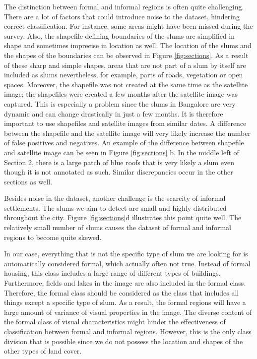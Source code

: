 The distinction between formal and informal regions is often quite challenging. There are a lot of factors that could introduce noise to the dataset, hindering correct classification. For instance, some areas might have been missed during the survey. Also, the shapefile defining boundaries of the slums are simplified in shape and sometimes imprecise in location as well. The location of the slums and the shapes of the boundaries can be observed in Figure \ref{fig:sections}. As a result of these sharp and simple shapes,  areas that are not part of a slum by itself are included as slums nevertheless, for example, parts of roads, vegetation or open spaces. Moreover, the shapefile was not created at the same time as the satellite image; the shapefiles were created a few months after the satellite image was captured. This is especially a problem since the slums in Bangalore are very dynamic and can change drastically in just a few months. It is therefore important to use shapefiles and satellite images from similar dates. A difference between the shapefile and the satellite image will very likely increase the number of false positives and negatives. An example of the difference between shapefile and satellite image can be seen in Figure \ref{fig:sections} b. In the middle left of Section 2, there is a large patch of blue roofs that is very likely a slum even though it is not annotated as such. Similar discrepancies occur in the other sections as well. 

Besides noise in the dataset, another challenge is the scarcity of informal settlements.  The slums we aim to detect are small and highly distributed throughout the city. Figure \ref{fig:sections}d illustrates this point quite well. The relatively small number of slums causes the dataset of formal and informal regions to become quite skewed.

In our case, everything that is not the specific type of slum we are looking for is automatically considered formal, which actually often not true. Instead of formal housing, this class includes a large range of different types of buildings. Furthermore, fields and lakes in the image are also included in the formal class. Therefore, the formal class should be considered as the class that includes all things except a specific type of slum. As a result, the formal regions will have a large amount of variance of visual properties in the image. The diverse content of the formal class of visual characteristics might hinder the effectiveness of classification between formal and informal regions. However, this is the only class division that is possible since we do not possess the location and shapes of the other types of land cover.

